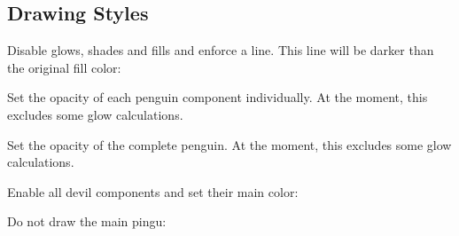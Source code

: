 \documentclass[parskip=half,english,numbers=noenddot,footnotes=nomultiple,oneside]{scrartcl}
\def\cursub{}
\begin{document}
\begin{tcblisting}{}
\begin{tikzpicture}
	\pingu[bill color=green]
\end{tikzpicture}
\end{tcblisting}
\endkeyexplain

\subsection{Drawing Styles}
\def\cursub{Styles!}
	Disable glows, shades and fills and enforce a line. This line will be darker
	than the original fill color:
\begin{tcblisting}{}
\begin{tikzpicture}
	\pingu[:line]
\end{tikzpicture}
\end{tcblisting}
\endkeyexplain

	Set the opacity of each penguin component individually. At the moment, this
	excludes some glow calculations.
\begin{tcblisting}{}
\end{tcblisting}
\endkeyexplain

	Set the opacity of the complete penguin. At the moment, this
	excludes some glow calculations.
\begin{tcblisting}{}
\begin{tikzpicture}
	\pingu[:ghost]
\end{tikzpicture}
\end{tcblisting}
\endkeyexplain

	Enable all devil components and set their main color:
\begin{tcblisting}{}
\begin{tikzpicture}
	\pingu[:devil=green]
\end{tikzpicture}
\end{tcblisting}
\endkeyexplain


	Do not draw the main pingu:
\begin{tcblisting}{}
\end{tcblisting}
\endkeyexplain
\end{document}
